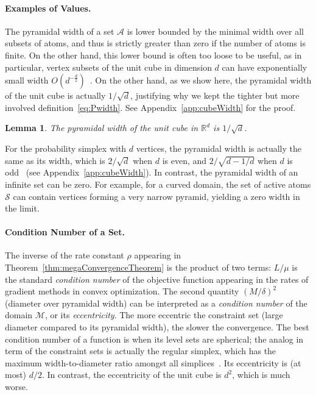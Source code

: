 \documentclass{article} %
\newtheorem{lemma}[definition]{Lemma}
\newcommand{\R}{\mathbb{R}}
\newcommand{\domain}{\mathcal{M}} %
\newcommand{\Vertices}{\mathcal{A}} %
\renewcommand{\S}{\mathcal{S}}
\newcommand{\0}{\mathbf{0}} %
\begin{document}
\paragraph{Examples of Values.} The pyramidal width of a set $\Vertices$ is
lower bounded by the minimal width over all subsets of atoms, and thus is
strictly greater than zero if the number of atoms is finite.
On the other hand, this lower bound is often too loose to be useful, as in
particular, vertex subsets of the unit cube in dimension $d$ can have exponentially small width $O(d^{-\frac{d}{2}})$~\citep[see
Corollary 27 in][]{Ziegler:1999:01polytope}.
On the other hand, as we show here, the pyramidal width of the unit cube is actually
$1/\sqrt{d}$, justifying why we kept the tighter but more involved
definition~\eqref{eq:Pwidth}. See Appendix~\ref{app:cubeWidth} for the proof.

%
\begin{lemma}\label{lem:cubeWidth}
The pyramidal width of the unit cube in $\R^d$ is $1/\sqrt{d}$.\vspace{-2mm}
\end{lemma}
For the probability simplex with $d$ vertices, the pyramidal width is
actually the same as its width, which is $2/\sqrt{d}$ when $d$ is
even, and $2/\sqrt{d\!-\!1/d}$ when $d$ is odd~\citep{Alexander:1977:simplex} (see Appendix~\ref{app:cubeWidth}). 
In contrast, the pyramidal width of an infinite set can be zero. For
example, for a curved domain, the set of active atoms $\S$ can contain
vertices %
forming a very narrow pyramid, yielding a zero width in the limit. \vspace{-2mm}

\paragraph{Condition Number of a Set.} The inverse of the rate constant
$\rho$ appearing in Theorem~\ref{thm:megaConvergenceTheorem} is the product
of two terms: $L/\mu$ is the standard \emph{condition number} of the objective function appearing in
the rates of gradient methods in convex optimization. The second quantity
$(M/\delta)^2$ (diameter over pyramidal width) can be interpreted as
a \emph{condition number} of the domain $\domain$, or its
\emph{eccentricity}. %
The more eccentric the constraint set (large diameter
compared to its pyramidal width), the slower the convergence. 
The best condition number of a function is when its level sets are spherical; the
analog in term of  the constraint sets is actually the regular simplex, which has the
maximum width-to-diameter ratio amongst all simplices~\citep[see Corollary 1
in][]{Alexander:1977:simplex}. Its eccentricity is (at most) $d/2$. In contrast, the
eccentricity of the unit cube is  $d^2$, which is much worse.
\end{document}
